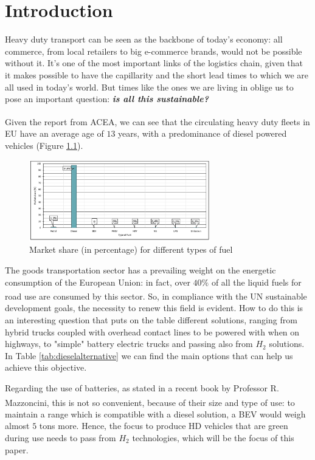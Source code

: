 \newpage
\chapter{Introduction}
Heavy duty transport can be seen as the backbone of today's economy: all commerce, from local retailers to big e-commerce brands, would not be possible without it. It's one of the most important links of the logistics chain, given that it makes possible to have the capillarity and the short lead times to which we are all used in today's world.
But times like the ones we are living in oblige us to pose an important question: \textbf{\textit{is all this sustainable?}}

Given the report from ACEA\textsuperscript{\cite{ACEA2021}}, we can see that the circulating heavy duty fleets in EU have an average age of $13$ years, with a predominance of diesel powered vehicles (Figure \ref{fig:hdpower}).

\begin{figure}[hb]
    \centering
    \includegraphics[width=0.7\textwidth]{Chapters/Pictures/Fuels_MarketShare.jpeg}
    \caption{Market share (in percentage) for different types of fuel}
    \label{fig:hdpower}
\end{figure}
The goods transportation sector has a prevailing weight on the energetic consumption of the European Union: in fact, over $40\%$ of all the liquid fuels for road use are consumed by this sector\textsuperscript{\cite{pianoidrogeno}}. So, in compliance with the UN sustainable development goals, the  necessity to renew this field is evident. How to do this is an interesting question that puts on the table different solutions, ranging from hybrid trucks coupled with overhead contact lines to be powered with when on highways, to "simple" battery electric trucks and passing also from $H_2$ solutions. In Table \ref{tab:dieselalternative} we can find the main options that can help us achieve this objective.

\newpage


Regarding the use of batteries, as stated in a recent book by Professor R. Mazzoncini\textsuperscript{\cite{Mazzo2021}}, this is not so convenient, because of their size and type of use: to maintain a range which is compatible with a diesel solution, a BEV would weigh almost $5$ tons more. Hence, the focus to produce HD vehicles that are green during use needs to pass from $H_2$ technologies, which will be the focus of this paper.

